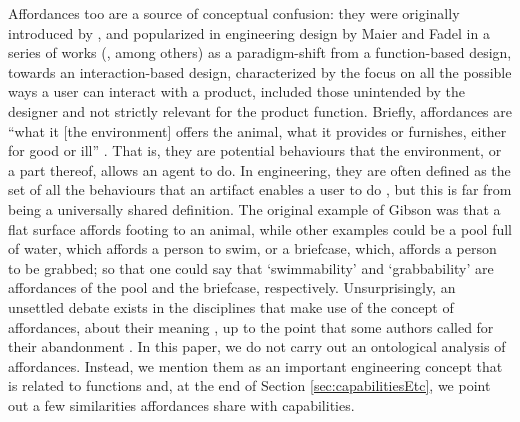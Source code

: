 \documentclass[sw]{iosart2x}
\newcommand{\quotes}[1]{`#1'}
\newcommand{\qquotes}[1]{``#1''}
\newcommand{\TODO}[1]{{\color{red} #1
}}
\newcommand{\TODOinline}[1]{{\color{red} #1
}}
\newcommand{\myComment}[1]{{\unskip \ignorespaces}}
\begin{document}
Affordances too are a source of conceptual confusion:
they were originally introduced by \cite{gibsonTheoryAffordances1979}, and popularized in engineering design by Maier and Fadel in a series of works (\cite{maier2001affordance,maierAffordanceBasedDesign2009}, among others) as a paradigm-shift from a function-based design, towards an interaction-based design, characterized by the focus on all the possible ways a user can interact with a product, included those unintended by the designer and not strictly relevant for the product function.
Briefly, affordances are \qquotes{what it [the environment] offers the animal, what it provides or furnishes, either for good or ill} \cite{gibsonTheoryAffordances1979}. That is, they are potential behaviours that the environment, or a part thereof, allows an agent to do. 
In engineering, they are often defined as the set of all the behaviours that an artifact enables a user to do \cite{brownRelationshipFunctionAffordance2005}, but this is far from being a universally shared definition.\myComment{\qquotes{interaction between artifact and user in which properties of the artifact offer a potential use to the user} \cite{maierAffordanceBasedDesign2009}}
The original example of Gibson was that a flat surface affords footing to an animal, while other examples could be a pool full of water, which affords a person to swim, or a briefcase, which, affords a person to be grabbed; so that one could say that \quotes{swimmability} and \quotes{grabbability} are affordances of the pool and the briefcase, respectively.
Unsurprisingly, an unsettled debate exists in the disciplines that make use of the concept of affordances, about their meaning \cite{brownRelationshipFunctionAffordance2005}, up to the point that some authors called for their abandonment \cite{motaDispensingTheoryPhilosophy2021}.
In this paper, we do not carry out an ontological analysis of affordances. 
Instead, we mention them as an important engineering concept that is related to functions \cite{brownRelationshipFunctionAffordance2005} and, at the end of Section \ref{sec:capabilitiesEtc}, we point out a few similarities affordances share with capabilities.



\end{document}
